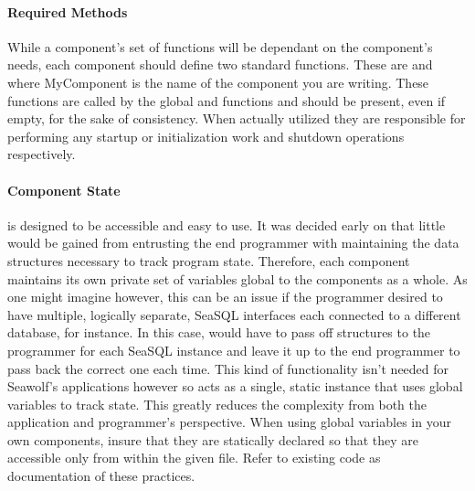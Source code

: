 \paragraph{Required Methods}
While a component's set of functions will be dependant on the component's needs,
each component should define two standard functions. These are 
\hfill\vspace{8pt}\newline
\indent{} and 
\vspace{8pt}\newline where MyComponent is the name of the component you are
writing. These functions are called by the global
 and
 functions and should be
present, even if empty, for the sake of consistency. When actually utilized they
are responsible for performing any startup or initialization work and shutdown
operations respectively.

\paragraph{Component State}
\libseawolf{} is designed to be accessible and easy to use. It was decided early
on that little would be gained from entrusting the end programmer with
maintaining the data structures necessary to track program state. Therefore,
each component maintains its own private set of variables global to the
components as a whole. As one might imagine however, this can be an issue if the
programmer desired to have multiple, logically separate, SeaSQL interfaces each
connected to a different database, for instance. In this case, \libseawolf{}
would have to pass off structures to the programmer for each SeaSQL instance and
leave it up to the end programmer to pass back the correct one each time. This
kind of functionality isn't needed for Seawolf's applications however so
\libseawolf{} acts as a single, static instance that uses global variables to
track state.  This greatly reduces the complexity from both the application and
\libseawolf{} programmer's perspective. When using global variables in your own
components, insure that they are statically declared so that they are accessible
only from within the given file. Refer to existing code as documentation of
these practices.


